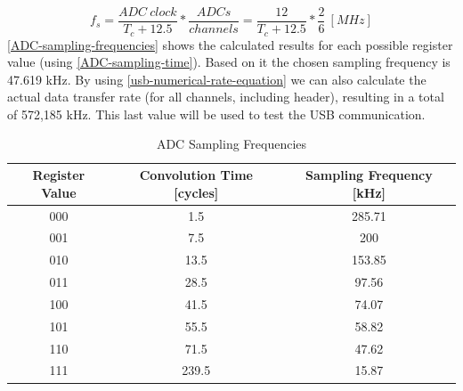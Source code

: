 \begin{equation}
  \label{ADC-sampling-time}
  f_{s} = \frac{ADC\ clock}{T_{c} + 12.5}  * \frac{ADCs}{channels} = \frac{12}{T_{c} + 12.5}  * \frac{2}{6}\ [MHz]
\end{equation}
\autoref{ADC-sampling-frequencies} shows the calculated results for each possible
register value (using \autoref{ADC-sampling-time}). Based on it the chosen sampling
frequency is 47.619 kHz. By using \autoref{usb-numerical-rate-equation} we can also
calculate the actual data transfer rate (for all channels, including header),
resulting in a total of 572,185 kHz. This last value will be used to test the USB communication.

\begin{table}[htb]
  \caption{ADC Sampling Frequencies}
  \label{ADC-sampling-frequencies}
  \begin{tabular}{c|c|c}
    \textbf{Register Value} & \textbf{Convolution Time [cycles]} & \textbf{Sampling Frequency [kHz]}\\
    \hline \hline
    000 & 1.5 & 285.71 \\
    \hline
    001 & 7.5 & 200 \\
    \hline
    010 & 13.5 & 153.85 \\
    \hline
    011 & 28.5 & 97.56 \\
    \hline
    100 & 41.5 & 74.07 \\
    \hline
    101 & 55.5 & 58.82 \\
    \hline
    110 & 71.5 & 47.62 \\
    \hline
    111 & 239.5 & 15.87 \\
  \end{tabular}
\end{table}
